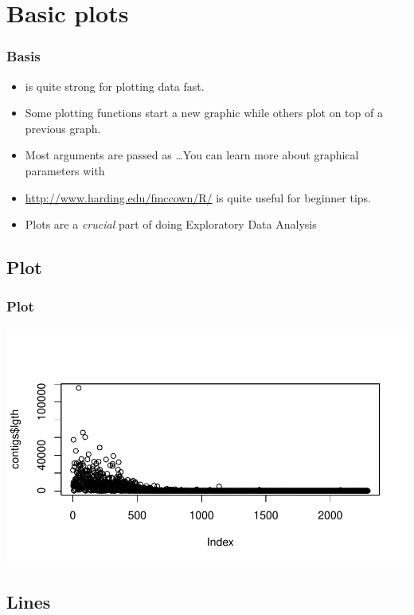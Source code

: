\section{Basic  plots}

\begin{frame}[allowframebreaks]
  \frametitle{Basis}
  \begin{itemize}
  \item {} is quite strong for plotting data fast.
  \item Some plotting functions start a new graphic while others plot on top of a previous graph.
  \item Most arguments are passed as \ldots You can learn more about graphical parameters with 
  \item \url{http://www.harding.edu/fmccown/R/} is quite useful for beginner tips.
  \item Plots are a \emph{crucial} part of doing \alert{Exploratory Data Analysis}
  \end{itemize}
\end{frame}

\subsection{Plot}

\begin{frame}
  \frametitle{Plot}
\begin{Schunk}
\end{Schunk}
\includegraphics{plots/figura-024}
\end{frame}

\subsection{Lines}

